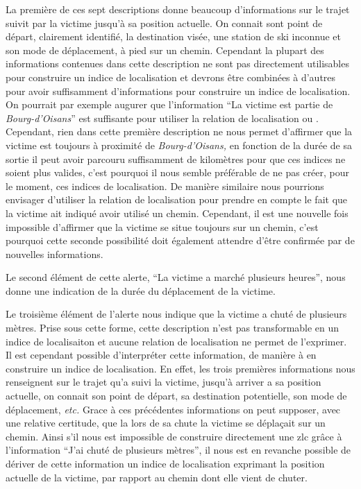 La première de ces sept descriptions donne beaucoup d'informations sur
le trajet suivit par la victime jusqu'à sa position actuelle. On
connait sont point de départ, clairement identifié, la destination
visée, une station de ski inconnue et son mode de déplacement, à pied
sur un chemin. Cependant la plupart des informations contenues dans
cette description ne sont pas directement utilisables pour construire
un indice de localisation et devrons être combinées à d'autres pour
avoir suffisamment d'informations pour construire un indice de
localisation. On pourrait par exemple augurer que l'information
\enquote{La victime est partie de \emph{Bourg-d'Oisans}} est
suffisante pour utiliser la relation de localisation
 ou . Cependant,
rien dans cette première description ne nous permet d'affirmer que la
victime est toujours à proximité de \emph{Bourg-d'Oisans,} en fonction
de la durée de sa sortie il peut avoir parcouru suffisamment de
kilomètres pour que ces indices ne soient plus valides, c'est pourquoi
il nous semble préférable de ne pas créer, pour le moment, ces indices
de localisation. De manière similaire nous pourrions envisager
d'utiliser la relation de localisation
 pour
prendre en compte le fait que la victime ait indiqué avoir utilisé un
chemin. Cependant, il est une nouvelle fois impossible d'affirmer que
la victime se situe toujours sur un chemin, c'est pourquoi cette
seconde possibilité doit également attendre d'être confirmée par de
nouvelles informations.

Le second élément de cette alerte, \enquote{La victime a marché
  plusieurs heures}, nous donne une indication de la durée du
déplacement de la victime. 


Le troisième élément de l'alerte nous indique que la victime a chuté
de plusieurs mètres. Prise sous cette forme, cette description n'est
pas transformable en un indice de localisaiton et aucune relation de
localisation ne permet de l'exprimer. Il est cependant possible
d'interpréter cette information, de manière à en construire un indice
de localisation. En effet, les trois premières informations nous
renseignent sur le trajet qu'a suivi la victime, jusqu'à arriver a sa
position actuelle, on connait son point de départ, sa destination
potentielle, son mode de déplacement, \emph{etc.} Grace à ces
précédentes informations on peut supposer, avec une relative
certitude, que la lors de sa chute la victime se déplaçait sur un
chemin. Ainsi s'il nous est impossible de construire directement une
\ac{zlc} grâce à l'information \enquote{J'ai chuté de plusieurs
  mètres}, il nous est en revanche possible de dériver de cette
information un indice de localisation exprimant la position actuelle
de la victime, par rapport au chemin dont elle vient de chuter.




